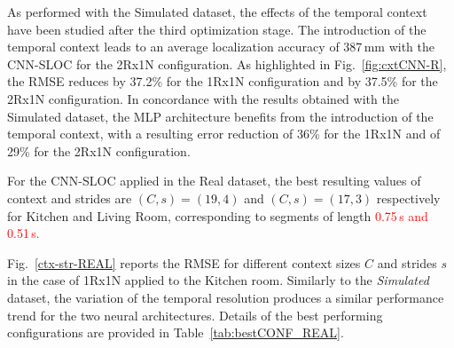 \documentclass[review]{elsarticle}
\newcommand{\figref}[1]{Fig.~\ref{#1}}
\newcommand{\tableref}[1]{Table~\ref{#1}}
\begin{document}
As performed with the Simulated dataset, the effects of the temporal context have been studied after the third optimization stage.  The introduction of the temporal context leads to an average localization accuracy of 387\,mm with the CNN-SLOC for the 2Rx1N configuration. As highlighted in \figref{fig:cxtCNN-R}, the RMSE reduces by 37.2\% for the 1Rx1N configuration and by 37.5\% for the 2Rx1N configuration. In concordance with the results obtained with the Simulated dataset, the MLP architecture benefits from the introduction of the temporal context, with a resulting error reduction of 36\% for the 1Rx1N and of 29\% for the 2Rx1N configuration.


For the CNN-SLOC applied in the Real dataset, the best resulting values of context and strides are $(C,s)=(19,4)$ and $(C,s)=(17,3)$ respectively for Kitchen and Living Room, corresponding to segments of length \textcolor{red}{0.75\,s and 0.51\,s.} 


\figref{ctx-str-REAL} reports the RMSE for different context sizes $C$ and strides $s$ in the case of 1Rx1N applied to the Kitchen room.
Similarly to the \textit{Simulated} dataset, the variation of the temporal resolution produces a similar performance trend for the two neural architectures. 
Details of the best performing configurations are provided in \tableref{tab:bestCONF_REAL}.
\end{document}
